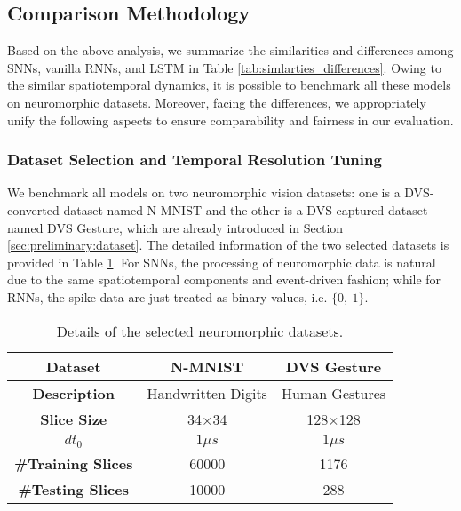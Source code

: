 \documentclass[journal,10pt,twocolumn]{IEEETran}
\begin{document}
\subsection{Comparison Methodology}

Based on the above analysis, we summarize the similarities and differences among SNNs, vanilla RNNs, and LSTM in Table \ref{tab:simlarties_differences}. Owing to the similar spatiotemporal dynamics, it is possible to benchmark all these models on neuromorphic datasets. Moreover, facing the differences, we appropriately unify the following aspects to ensure comparability and fairness in our evaluation. 

\bigskip
\subsubsection{Dataset Selection and Temporal Resolution Tuning}\quad

We benchmark all models on two neuromorphic vision datasets: one is a DVS-converted dataset named N-MNIST and the other is a DVS-captured dataset named DVS Gesture, which are already introduced in Section \ref{sec:preliminary:dataset}. The detailed information of the two selected datasets is provided in Table \ref{tab:dataset}. For SNNs, the processing of neuromorphic data is natural due to the same spatiotemporal components and event-driven fashion; while for RNNs, the spike data are just treated as binary values, i.e. $\{0,~1\}$. 

\begin{table}[!htbp]
\caption{Details of the selected neuromorphic datasets.}
\label{tab:dataset}
\vspace{2pt}
\centering
\begin{tabular}{ccc}
\hline\hline
\textbf{Dataset}     & N-MNIST  & DVS Gesture      \\ \hline
\textbf{Description} & Handwritten Digits & Human Gestures \\
\textbf{Slice Size}  & 34$\times$34  & 128$\times$128  \\
$dt_0$       & $1\mu s$               & $1\mu s$ \\
\textbf{\#Training Slices} & 60000    & 1176   \\
\textbf{\#Testing Slices}  & 10000    & 288     \\ 
\hline\hline
\end{tabular}
\end{table}
\end{document}
